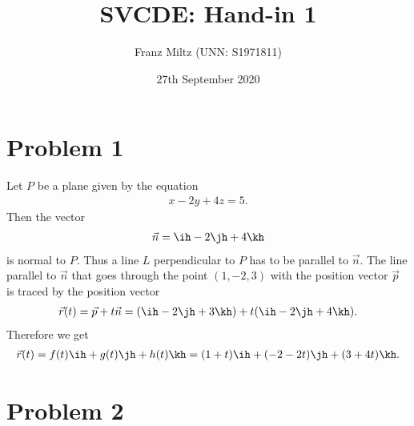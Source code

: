 \documentclass{article}
\begin{document}
\title{SVCDE: Hand-in 1}
\author{Franz Miltz (UNN: S1971811)}
\date{27th September 2020}
\maketitle


\section*{Problem 1}


Let $P$ be a plane given by the equation
\begin{align*}
  x - 2y + 4z = 5.
\end{align*}
Then the vector
\begin{align*}
  \vec n = \ih - 2 \jh + 4 \kh
\end{align*}
is normal to $P$. Thus a line $L$ perpendicular to $P$ has to be
parallel to $\vec n$. The line parallel to $\vec n$ that goes through
the point $(1,-2,3)$ with the position vector $\vec p$ is traced by the position vector
\begin{align*}
  \vec r(t) = \vec p + t \vec n
  = (\ih - 2\jh + 3\kh) + t(\ih - 2\jh + 4\kh).
\end{align*}
Therefore we get
\begin{align*}
  \vec r (t) = f(t)\ih + g(t)\jh + h(t)\kh = (1+t)\ih+(-2-2t)\jh+(3+4t)\kh.
\end{align*}


\section*{Problem 2}
\end{document}
